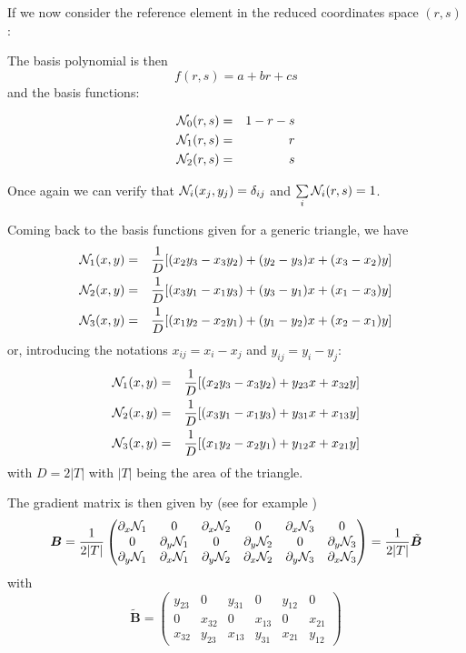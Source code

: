 \noindent If we now consider the reference element in the reduced coordinates space $(r,s)$:



The basis polynomial is then
\[
f(r,s) = a + br + cs 
\]
and the basis functions:
\begin{mdframed}[backgroundcolor=blue!5]
\begin{eqnarray}
{\mathcal{N}}_0(r,s) &=& 1-r-s \\
{\mathcal{N}}_1(r,s) &=& r \\
{\mathcal{N}}_2(r,s) &=& s 
\end{eqnarray}
\end{mdframed}
Once again we can verify that ${\mathcal{N}}_i(x_j,y_j)=\delta_{ij}$ and $\sum\limits_i {\mathcal{N}}_i(r,s)=1$.


Coming back to the basis functions given for a generic triangle, we have
\begin{eqnarray}
{\mathcal{N}}_1(x,y) &=& \frac{1}{D}[(x_2y_3-x_3y_2) + (y_2-y_3)x + (x_3-x_2)y] \nonumber\\
{\mathcal{N}}_2(x,y) &=& \frac{1}{D}[(x_3y_1-x_1y_3) + (y_3-y_1)x + (x_1-x_3)y] \nonumber\\
{\mathcal{N}}_3(x,y) &=& \frac{1}{D}[(x_1y_2-x_2y_1) + (y_1-y_2)x + (x_2-x_1)y] \nonumber
\end{eqnarray}
or, introducing the notations $x_{ij}=x_i-x_j$ and $y_{ij}=y_i-y_j$:
\begin{eqnarray}
{\mathcal{N}}_1(x,y) &=& \frac{1}{D}[(x_2y_3-x_3y_2) + y_{23} x + x_{32} y] \nonumber\\
{\mathcal{N}}_2(x,y) &=& \frac{1}{D}[(x_3y_1-x_1y_3) + y_{31} x + x_{13} y] \nonumber\\
{\mathcal{N}}_3(x,y) &=& \frac{1}{D}[(x_1y_2-x_2y_1) + y_{12} x + x_{21} y] \nonumber
\end{eqnarray}
with $D=2|T|$ with $|T|$ being the area of the triangle.



The gradient matrix is then given by (see for example \cite{koko07}) 
\[
{\bm B} = 
\frac{1}{2|T|}
\begin{pmatrix}
\partial_x {\mathcal{N}}_1 & 0 & \partial_x {\mathcal{N}}_2 & 0 & \partial_x {\mathcal{N}}_3 & 0 \\
0 & \partial_y {\mathcal{N}}_1 & 0 & \partial_y {\mathcal{N}}_2 & 0 & \partial_y {\mathcal{N}}_3 \\
\partial_y {\mathcal{N}}_1 & \partial_x {\mathcal{N}}_1 &
\partial_y {\mathcal{N}}_2 & \partial_x {\mathcal{N}}_2 &
\partial_y {\mathcal{N}}_3 & \partial_x {\mathcal{N}}_3 
\end{pmatrix}
= \frac{1}{2|T|} \tilde{\bm B}
\]
with 
\[
\tilde{\bm B}=
\begin{pmatrix}
y_{23} & 0 & y_{31} & 0 & y_{12} & 0 \\
0 & x_{32} & 0 & x_{13} & 0 & x_{21} \\
x_{32} & y_{23} & x_{13} & y_{31} & x_{21} & y_{12}
\end{pmatrix}
\]

